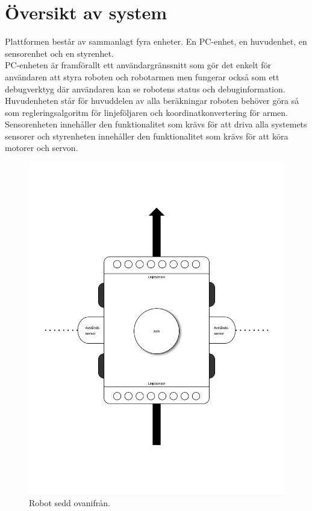 \section{Översikt av system}
Plattformen består av sammanlagt fyra enheter. En PC-enhet, en huvudenhet, en sensorenhet och en styrenhet. \\
PC-enheten är framförallt ett användargränssnitt som gör det enkelt för användaren att styra roboten och robotarmen men fungerar också som ett debugverktyg där användaren kan se robotens status och debuginformation. Huvudenheten står för huvuddelen av alla beräkningar roboten behöver göra så som regleringsalgoritm för linjeföljaren och koordinatkonvertering för armen. Sensorenheten innehåller den funktionalitet som krävs för att driva alla systemets sensorer och styrenheten innehåller den funktionalitet som krävs för att köra motorer och servon.

\begin{figure}[h]
\center
\includegraphics[scale=0.15]{robot}
\caption{Robot sedd ovanifrån. } \label{designspec:robot}
\end{figure}

